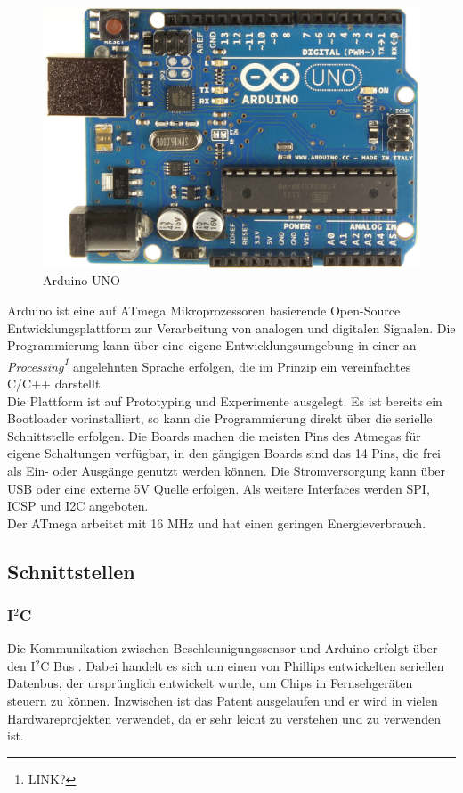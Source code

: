 \documentclass[12pt,a4paper]{scrartcl}
\begin{document}
\begin{figure}[h]
\centering
\includegraphics[scale=.2]{hardwareimages/ArduinoUno_R3_Front.jpg}
\caption{Arduino UNO}
\label{Arduino}
\end{figure}


Arduino ist eine auf ATmega Mikroprozessoren basierende Open-Source Entwicklungsplattform zur Verarbeitung von analogen und digitalen Signalen. Die Programmierung kann über eine eigene Entwicklungsumgebung in einer an \textit{Processing\footnote{LINK?}} angelehnten Sprache erfolgen, die im Prinzip ein vereinfachtes C/C++ darstellt.\\
Die Plattform ist auf Prototyping und Experimente ausgelegt. Es ist bereits ein Bootloader vorinstalliert, so kann die Programmierung direkt über die serielle Schnittstelle erfolgen. Die Boards machen die meisten Pins des Atmegas für eigene Schaltungen verfügbar, in den gängigen Boards sind das 14 Pins, die frei als Ein- oder Ausgänge genutzt werden können.
Die Stromversorgung kann über USB oder eine externe 5V Quelle erfolgen. Als weitere Interfaces werden SPI, ICSP und I2C angeboten.\\
Der ATmega arbeitet mit 16 MHz und hat einen geringen Energieverbrauch.


\subsection{Schnittstellen}

\subsubsection{I$^2$C}
Die Kommunikation zwischen Beschleunigungssensor und Arduino erfolgt über den  I$^2$C Bus \citep{:2012fj}.
Dabei handelt es sich um einen von Phillips entwickelten seriellen Datenbus, der ursprünglich entwickelt wurde, um Chips in Fernsehgeräten steuern zu können. Inzwischen ist das Patent ausgelaufen und er wird in vielen Hardwareprojekten verwendet, da er sehr leicht zu verstehen und zu verwenden ist. 
\end{document}
